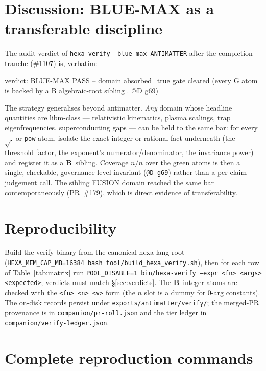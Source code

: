 \documentclass[11pt,a4paper]{article}
\newcommand{\tierBlue}{\textbf{B}}
\begin{document}
\section{Discussion: BLUE-MAX as a transferable discipline}
\label{sec:discussion}

The audit verdict of \texttt{hexa verify --blue-max ANTIMATTER} after the
completion tranche (\#1107) is, verbatim:
\begin{verdict}
verdict: BLUE-MAX PASS -- domain absorbed=true gate cleared
         (every G atom is backed by a B algebraic-root sibling . @D g69)
\end{verdict}

\noindent The strategy generalises beyond antimatter. \emph{Any} domain
whose headline quantities are libm-class --- relativistic kinematics,
plasma scalings, trap eigenfrequencies, superconducting gaps --- can be held
to the same bar: for every $\sqrt{\,}$ or \texttt{pow} atom, isolate the
exact integer or rational fact underneath (the threshold factor, the
exponent's numerator/denominator, the invariance power) and register it as a
\tierBlue\ sibling. Coverage $n/n$ over the green atoms is then a single,
checkable, governance-level invariant (\texttt{@D~g69}) rather than a
per-claim judgement call. The sibling FUSION domain reached the same bar
contemporaneously (PR~\#179), which is direct evidence of transferability.

\section{Reproducibility}
\label{sec:repro}

Build the verify binary from the canonical hexa-lang root
(\texttt{HEXA\_MEM\_CAP\_MB=16384 bash tool/build\_hexa\_verify.sh}), then
for each row of Table~\ref{tab:matrix} run \texttt{POOL\_DISABLE=1
bin/hexa-verify --expr <fn> <args> <expected>}; verdicts must match
\S\ref{sec:verdicts}. The \tierBlue\ integer atoms are checked with the
\texttt{<fn> <n> <v>} form (the $n$ slot is a dummy for 0-arg constants). The
on-disk records persist under
\texttt{exports/antimatter/verify/}; the merged-PR provenance is in
\texttt{companion/pr-roll.json} and the tier ledger in
\texttt{companion/verify-ledger.json}.

\appendix
\section{Complete reproduction commands}
\label{app:repro}
\end{document}
